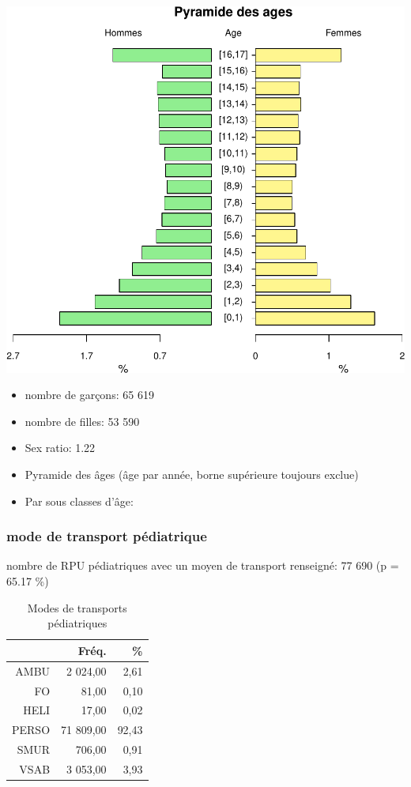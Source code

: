 \documentclass[]{article}
\begin{document}
\includegraphics{rapport2014_V4_files/figure-latex/unnamed-chunk-10-1.pdf}

\begin{itemize}
\itemsep1pt\parskip0pt
\item
  nombre de garçons: 65 619
\item
  nombre de filles: 53 590
\item
  Sex ratio: 1.22
\item
  Pyramide des âges (âge par année, borne supérieure toujours exclue)
\item
  Par sous classes d'âge:
\end{itemize}

\subsubsection{mode de transport
pédiatrique}\label{mode-de-transport-pediatrique}

nombre de RPU pédiatriques avec un moyen de transport renseigné: 77 690
(p = 65.17 \%)

\begin{table}[ht]
\centering
\begin{tabular}{rrr}
  \hline
 & Fréq. & \% \\ 
  \hline
AMBU & 2 024,00 & 2,61 \\ 
  FO & 81,00 & 0,10 \\ 
  HELI & 17,00 & 0,02 \\ 
  PERSO & 71 809,00 & 92,43 \\ 
  SMUR & 706,00 & 0,91 \\ 
  VSAB & 3 053,00 & 3,93 \\ 
   \hline
\end{tabular}
\caption{Modes de transports pédiatriques} 
\end{table}
\end{document}
